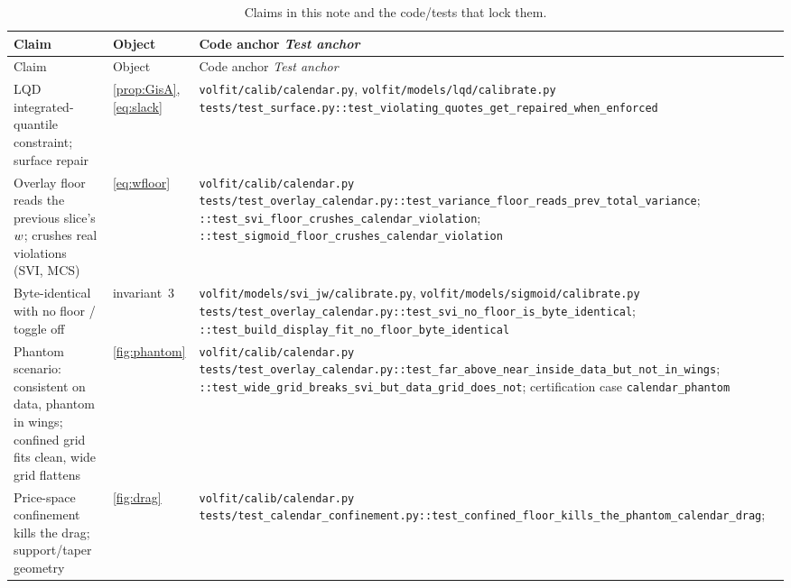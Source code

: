 \documentclass[11pt]{article}
\begin{document}
\begingroup
\small
\setlength{\tabcolsep}{4pt}
\renewcommand{\arraystretch}{1.15}
\begin{longtable}{@{}p{}p{}p{}@{}}
\caption{Claims in this note and the code/tests that lock them.}
\label{tab:trace}\\
\toprule Claim & Object & Code anchor \newline \emph{Test anchor}\\ \midrule
\endfirsthead
\toprule Claim & Object & Code anchor \newline \emph{Test anchor}\\ \midrule
\endhead
LQD integrated-quantile constraint; surface repair &
\cref{prop:GisA}, \eqref{eq:slack} &
\nolinkurl{volfit/calib/calendar.py},
\nolinkurl{volfit/models/lqd/calibrate.py}\newline
\nolinkurl{tests/test_surface.py::test_violating_quotes_get_repaired_when_enforced}\\
\addlinespace
Overlay floor reads the previous slice's $w$; crushes real
violations (SVI, MCS) &
\eqref{eq:wfloor} &
\nolinkurl{volfit/calib/calendar.py}\newline
\nolinkurl{tests/test_overlay_calendar.py::test_variance_floor_reads_prev_total_variance};
\nolinkurl{::test_svi_floor_crushes_calendar_violation};
\nolinkurl{::test_sigmoid_floor_crushes_calendar_violation}\\
\addlinespace
Byte-identical with no floor / toggle off &
invariant~3 &
\nolinkurl{volfit/models/svi_jw/calibrate.py},
\nolinkurl{volfit/models/sigmoid/calibrate.py}\newline
\nolinkurl{tests/test_overlay_calendar.py::test_svi_no_floor_is_byte_identical};
\nolinkurl{::test_build_display_fit_no_floor_byte_identical}\\
\addlinespace
Phantom scenario: consistent on data, phantom in wings; confined grid
fits clean, wide grid flattens &
\cref{fig:phantom} &
\nolinkurl{volfit/calib/calendar.py}\newline
\nolinkurl{tests/test_overlay_calendar.py::test_far_above_near_inside_data_but_not_in_wings};
\nolinkurl{::test_wide_grid_breaks_svi_but_data_grid_does_not};
certification case \texttt{calendar\_phantom}\\
\addlinespace
Price-space confinement kills the drag; support/taper geometry &
\cref{fig:drag} &
\nolinkurl{volfit/calib/calendar.py}\newline
\nolinkurl{tests/test_calendar_confinement.py::test_confined_floor_kills_the_phantom_calendar_drag};

\end{longtable}
\end{document}
